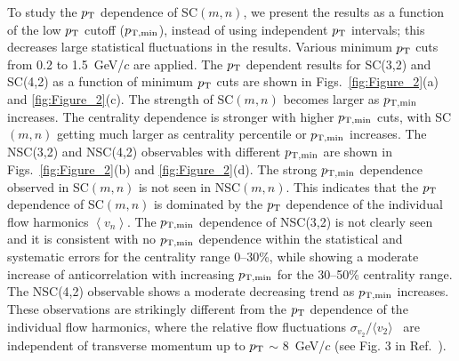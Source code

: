 To study the $p_{\rm T}$ dependence of SC$(m,n)$, we present the results as a function of the low $p_{\rm T}$ cutoff ($p_{\rm T, min}$), instead of using independent $p_{\rm T}$ intervals; this decreases large statistical fluctuations in the results. Various minimum $p_{\rm T}$ cuts from 0.2 to 1.5~GeV/$c$ are applied.
The $p_{\rm T}$ dependent results for SC(3,2) and SC(4,2) as a function of minimum $p_{\rm T}$ cuts are shown in Figs.~\ref{fig:Figure_2}(a) and \ref{fig:Figure_2}(c).
The strength of SC$(m,n)$ becomes larger as $p_{\rm T, min}$ increases. 
The centrality dependence is stronger with higher $p_{\rm T, min}$ cuts, with SC$(m,n)$ getting much larger as centrality percentile or $p_{\rm T, min}$ increases. 
The NSC(3,2) and NSC(4,2) observables with different $p_{\rm T, min}$ are shown in Figs.~\ref{fig:Figure_2}(b) and \ref{fig:Figure_2}(d).
The strong $p_{\rm T, min}$ dependence observed in SC$(m,n)$ is not seen in NSC$(m,n)$. 
This indicates that the $p_{\rm T}$ dependence of SC$(m,n)$ is dominated by the $p_{\rm T}$  dependence of the individual flow harmonics $\left<v_n\right>$. 
The $p_{\rm T, min}$ dependence of NSC(3,2) is not clearly seen and it is consistent with no $p_{\rm T, min}$ dependence within the statistical and systematic errors for the centrality range 0--30\%, while showing a moderate increase of anticorrelation with increasing $p_{\rm T, min}$ for the 30--50\% centrality range.
The NSC(4,2) observable shows a moderate decreasing trend as $p_{\rm T, min}$ increases. These observations are strikingly different from the $p_{\rm T}$ dependence of the individual flow harmonics, where the relative flow fluctuations $\sigma_{v_2}/\langle v_{2} \rangle$~\cite{Voloshin:2008dg} are independent of transverse momentum up to $p_{\rm T}$ $\sim$ 8~GeV/$c$ (see Fig. 3 in Ref.~\cite{Abelev:2012di}).

